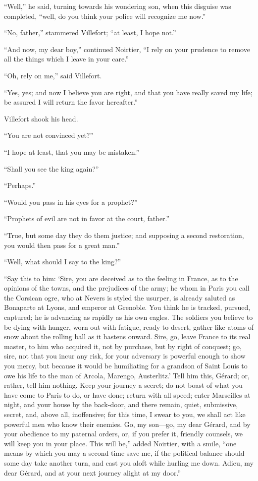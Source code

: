 “Well,” he said, turning towards his wondering son, when this disguise
was completed, “well, do you think your police will recognize me now.”

“No, father,” stammered Villefort; “at least, I hope not.”

“And now, my dear boy,” continued Noirtier, “I rely on your prudence to
remove all the things which I leave in your care.”

“Oh, rely on me,” said Villefort.

“Yes, yes; and now I believe you are right, and that you have really
saved my life; be assured I will return the favor hereafter.”

Villefort shook his head.

“You are not convinced yet?”

“I hope at least, that you may be mistaken.”

“Shall you see the king again?”

“Perhaps.”

“Would you pass in his eyes for a prophet?”

“Prophets of evil are not in favor at the court, father.”

“True, but some day they do them justice; and supposing a second
restoration, you would then pass for a great man.”

“Well, what should I say to the king?”

“Say this to him: ‘Sire, you are deceived as to the feeling in France,
as to the opinions of the towns, and the prejudices of the army; he
whom in Paris you call the Corsican ogre, who at Nevers is styled the
usurper, is already saluted as Bonaparte at Lyons, and emperor at
Grenoble. You think he is tracked, pursued, captured; he is advancing
as rapidly as his own eagles. The soldiers you believe to be dying with
hunger, worn out with fatigue, ready to desert, gather like atoms of
snow about the rolling ball as it hastens onward. Sire, go, leave
France to its real master, to him who acquired it, not by purchase, but
by right of conquest; go, sire, not that you incur any risk, for your
adversary is powerful enough to show you mercy, but because it would be
humiliating for a grandson of Saint Louis to owe his life to the man of
Arcola, Marengo, Austerlitz.’ Tell him this, Gérard; or, rather, tell
him nothing. Keep your journey a secret; do not boast of what you have
come to Paris to do, or have done; return with all speed; enter
Marseilles at night, and your house by the back-door, and there remain,
quiet, submissive, secret, and, above all, inoffensive; for this time,
I swear to you, we shall act like powerful men who know their enemies.
Go, my son—go, my dear Gérard, and by your obedience to my paternal
orders, or, if you prefer it, friendly counsels, we will keep you in
your place. This will be,” added Noirtier, with a smile, “one means by
which you may a second time save me, if the political balance should
some day take another turn, and cast you aloft while hurling me down.
Adieu, my dear Gérard, and at your next journey alight at my door.”

